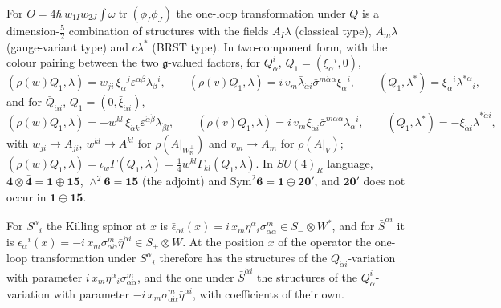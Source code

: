 \begin{remark}
For $O=4\hbar\,w_{1I}w_{2J}\int\omega\operatorname{tr}(\phi_I\phi_J)$ the one-loop transformation under $Q$ is a dimension-$\tfrac52$ combination of structures with the fields $A_I\lambda$ (classical type), $A_m\lambda$ (gauge-variant type) and $c\lambda^*$ (BRST type). In two-component form, with the colour pairing between the two $\mathfrak g$-valued factors, for $Q^i_\alpha$, $Q_1=(\xi_\alpha{}^i,0)$,
\[
(\rho(w)Q_1,\lambda)=w_{ji}\,\xi_\alpha{}^j\varepsilon^{\alpha\beta}\lambda_\beta{}^i,\qquad (\rho(v)Q_1,\lambda)=i\,v_m\bar\lambda_{\dot\alpha i}\bar\sigma^{m\dot\alpha\alpha}\xi_\alpha{}^i,\qquad (Q_1,\lambda^*)=\xi_\alpha{}^i\lambda^{*\alpha}{}_i,
\]
and for $\bar Q_{\dot\alpha i}$, $Q_1=(0,\bar\xi_{\dot\alpha i})$,
\[
(\rho(w)Q_1,\lambda)=-w^{kl}\,\bar\xi_{\dot\alpha k}\varepsilon^{\dot\alpha\dot\beta}\bar\lambda_{\dot\beta l},\qquad (\rho(v)Q_1,\lambda)=i\,v_m\bar\xi_{\dot\alpha i}\bar\sigma^{m\dot\alpha\alpha}\lambda_\alpha{}^i,\qquad (Q_1,\lambda^*)=-\bar\xi_{\dot\alpha i}\bar\lambda^{*\dot\alpha i},
\]
with $w_{ji}\to A_{ji}$, $w^{kl}\to A^{kl}$ for $\rho(A|_{W_{\mathbb R}^\perp})$ and $v_m\to A_m$ for $\rho(A|_V)$; $(\rho(w)Q_1,\lambda)=\iota_w\Gamma(Q_1,\lambda)=\tfrac14w^{kl}\Gamma_{kl}(Q_1,\lambda)$. In $SU(4)_R$ language, $\mathbf4\otimes\bar{\mathbf4}=\mathbf1\oplus\mathbf{15}$, $\wedge^2\mathbf6=\mathbf{15}$ (the adjoint) and $\mathrm{Sym}^2\mathbf6=\mathbf1\oplus\mathbf{20'}$, and $\mathbf{20'}$ does not occur in $\mathbf1\oplus\mathbf{15}$.
\end{remark}

\begin{remark}
For $S^\alpha{}_i$ the Killing spinor at $x$ is $\bar\epsilon_{\dot\alpha i}(x)=i\,x_m\eta^\alpha{}_i\sigma^m_{\alpha\dot\alpha}\in S_-\otimes W^*$, and for $\bar S^{\dot\alpha i}$ it is $\epsilon_\alpha{}^i(x)=-i\,x_m\sigma^m_{\alpha\dot\alpha}\bar\eta^{\dot\alpha i}\in S_+\otimes W$. At the position $x$ of the operator the one-loop transformation under $S^\alpha{}_i$ therefore has the structures of the $\bar Q_{\dot\alpha i}$-variation with parameter $i\,x_m\eta^\alpha{}_i\sigma^m_{\alpha\dot\alpha}$, and the one under $\bar S^{\dot\alpha i}$ the structures of the $Q^i_\alpha$-variation with parameter $-i\,x_m\sigma^m_{\alpha\dot\alpha}\bar\eta^{\dot\alpha i}$, with coefficients of their own.
\end{remark}

